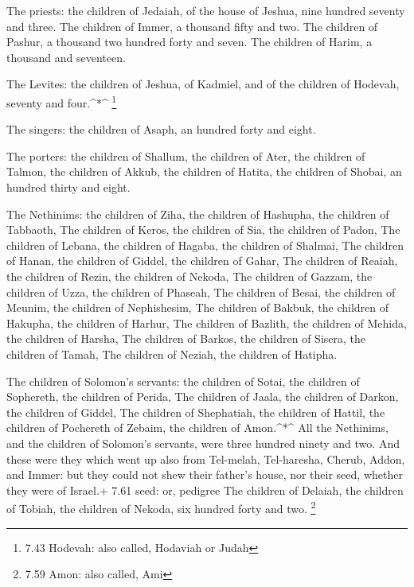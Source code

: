  The priests: the children of Jedaiah, of the house of
Jeshua, nine hundred seventy and three.  The children of
Immer, a thousand fifty and two.  The children of Pashur, a
thousand two hundred forty and seven.  The children of
Harim, a thousand and seventeen.

 The Levites: the children of Jeshua, of Kadmiel, and of
the children of Hodevah, seventy and four.\^{}*\^{} \footnote{7.43
  Hodevah: also called, Hodaviah or Judah}

 The singers: the children of Asaph, an hundred forty and
eight.

 The porters: the children of Shallum, the children of
Ater, the children of Talmon, the children of Akkub, the children of
Hatita, the children of Shobai, an hundred thirty and eight.

 The Nethinims: the children of Ziha, the children of
Hashupha, the children of Tabbaoth,  The children of Keros,
the children of Sia, the children of Padon,  The children
of Lebana, the children of Hagaba, the children of Shalmai,
 The children of Hanan, the children of Giddel, the
children of Gahar,  The children of Reaiah, the children of
Rezin, the children of Nekoda,  The children of Gazzam, the
children of Uzza, the children of Phaseah,  The children of
Besai, the children of Meunim, the children of Nephishesim,
 The children of Bakbuk, the children of Hakupha, the
children of Harhur,  The children of Bazlith, the children
of Mehida, the children of Harsha,  The children of Barkos,
the children of Sisera, the children of Tamah,  The
children of Neziah, the children of Hatipha.

 The children of Solomon's servants: the children of Sotai,
the children of Sophereth, the children of Perida,  The
children of Jaala, the children of Darkon, the children of Giddel,
 The children of Shephatiah, the children of Hattil, the
children of Pochereth of Zebaim, the children of Amon.\^{}*\^{}
 All the Nethinims, and the children of Solomon's servants,
were three hundred ninety and two.  And these were they
which went up also from Tel-melah, Tel-haresha, Cherub, Addon, and
Immer: but they could not shew their father's house, nor their seed,
whether they were of Israel.+ 7.61 seed: or, pedigree  The
children of Delaiah, the children of Tobiah, the children of Nekoda, six
hundred forty and two. \footnote{7.59 Amon: also called, Ami}

